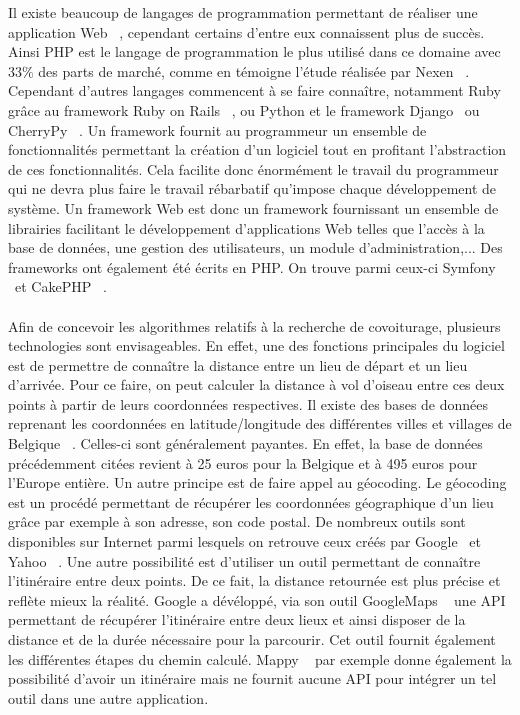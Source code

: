 \documentclass[12pt, a4paper, oneside]{article}
\begin{document}
    \indent Il existe beaucoup de langages de programmation permettant de réaliser une application Web ~\cite{web-development}, cependant certains d'entre eux connaissent plus de succès. Ainsi PHP est le langage de programmation le plus utilisé dans ce domaine avec 33$\%$ des parts de marché, comme en témoigne l'étude réalisée par Nexen ~\cite{stats-PHP}. Cependant d'autres langages commencent à se faire connaître, notamment Ruby grâce au framework Ruby on Rails ~\cite{ROR}, ou Python et le framework Django ~\cite{Django}ou CherryPy ~\cite{CherryPy}. Un framework fournit au programmeur un ensemble de fonctionnalités permettant la création d'un logiciel tout en profitant l'abstraction de ces fonctionnalités. Cela facilite donc énormément le travail du programmeur qui ne devra plus faire le travail rébarbatif qu'impose chaque développement de système. Un framework Web est donc un framework fournissant un ensemble de librairies facilitant le développement d'applications Web telles que l'accès à la base de données, une gestion des utilisateurs, un module d'administration,... Des frameworks ont également été écrits en PHP. On trouve parmi ceux-ci Symfony ~\cite{Symfony}et CakePHP ~\cite{CakePHP}.\\\\
    \indent Afin de concevoir les algorithmes relatifs à la recherche de covoiturage, plusieurs technologies sont envisageables. En effet, une des fonctions principales du logiciel est de permettre de connaître la distance entre un lieu de départ et un lieu d'arrivée. Pour ce faire, on peut calculer la distance à vol d'oiseau entre ces deux points à partir de leurs coordonnées respectives. Il existe des bases de données reprenant les coordonnées en latitude/longitude des différentes villes et villages de Belgique ~\cite{zip-code-DB}. Celles-ci sont généralement payantes. En effet, la base de données précédemment citées revient à 25 euros pour la Belgique et à 495 euros pour l'Europe entière. Un autre principe est de faire appel au géocoding. Le géocoding est un procédé permettant de récupérer les coordonnées géographique d'un lieu grâce par exemple à son adresse, son code postal. De nombreux outils sont disponibles sur Internet parmi lesquels on retrouve ceux créés par Google ~\cite{google-geoconding}et Yahoo ~\cite{yahoo-geocoding}. Une autre possibilité est d'utiliser un outil permettant de connaître l'itinéraire entre deux points. De ce fait, la distance retournée est plus précise et reflète mieux la réalité. Google a dévéloppé, via son outil GoogleMaps ~\cite{google-map} une API permettant de récupérer l'itinéraire entre deux lieux et ainsi disposer de la distance et de la durée nécessaire pour la parcourir. Cet outil fournit également les différentes étapes du chemin calculé. Mappy ~\cite{Mappy} par exemple donne également la possibilité d'avoir un itinéraire mais ne fournit aucune API pour intégrer un tel outil dans une autre application.
\end{document}

